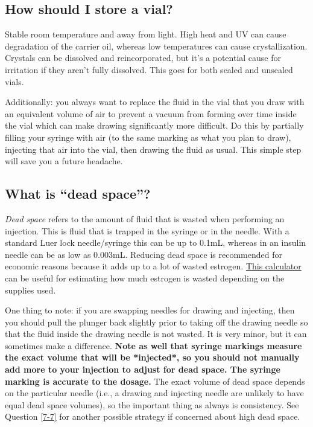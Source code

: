 \documentclass{article}
\begin{document}
\subsection{How should I store a vial?}\label{5-25}

Stable room temperature and away from light. High heat and UV can cause degradation of the carrier oil, whereas low temperatures can cause crystallization. Crystals can be dissolved and reincorporated, but it’s a potential cause for irritation if they aren’t fully dissolved. This goes for both sealed and unsealed vials.

Additionally: you always want to replace the fluid in the vial that you draw with an equivalent volume of air to prevent a vacuum from forming over time inside the vial which can make drawing significantly more difficult. Do this by partially filling your syringe with air (to the same marking as what you plan to draw), injecting that air into the vial, then drawing the fluid as usual. This simple step will save you a future headache.

\subsection{What is “dead space”?}\label{5-26}

\textit{Dead space} refers to the amount of fluid that is wasted when performing an injection. This is fluid that is trapped in the syringe or in the needle. With a standard Luer lock needle/syringe this can be up to 0.1mL, whereas in an insulin needle can be as low as 0.003mL. Reducing dead space is recommended for economic reasons because it adds up to a lot of wasted estrogen. \href{https://hrtcafe.net/Calc/}{This calculator} can be useful for estimating how much estrogen is wasted depending on the supplies used.

One thing to note: if you are swapping needles for drawing and injecting, then you should pull the plunger back slightly prior to taking off the drawing needle so that the fluid inside the drawing needle is not wasted. It is very minor, but it can sometimes make a difference. \textbf{Note as well that syringe markings measure the exact volume that will be *injected*, so you should not manually add more to your injection to adjust for dead space. The syringe marking is accurate to the dosage.} The exact volume of dead space depends on the particular needle (i.e., a drawing and injecting needle are unlikely to have equal dead space volumes), so the important thing as always is consistency. See Question \ref{7-7} for another possible strategy if concerned about high dead space.
\end{document}
